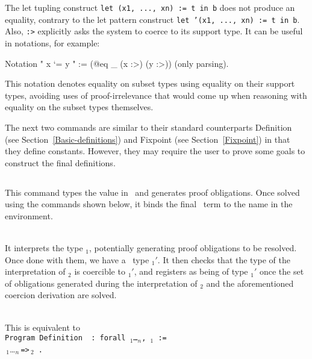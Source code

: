 The let tupling construct {\tt let (x1, ..., xn) := t in b}
does not produce an equality, contrary to the let pattern construct 
{\tt let '(x1, ..., xn) := t in b}.
Also, {\tt {\term}:>} explicitly asks the system to coerce {\tt \term} to its
support type. It can be useful in notations, for example:
\begin{coq_example}
Notation " x `= y " := (@eq _ (x :>) (y :>)) (only parsing).
\end{coq_example}

This notation denotes equality on subset types using equality on their
support types, avoiding uses of proof-irrelevance that would come up
when reasoning with equality on the subset types themselves. 

The next two commands are similar to their standard counterparts
Definition (see Section~\ref{Basic-definitions}) and Fixpoint (see Section~\ref{Fixpoint}) in that
they define constants. However, they may require the user to prove some
goals to construct the final definitions.

\subsection{}

This command types the value {\term} in \Russell\ and generates proof
obligations. Once solved using the commands shown below, it binds the final
\Coq\ term to the name {\ident} in the environment.

\begin{ErrMsgs}
\item {}
\end{ErrMsgs}

\begin{Variants}
\item {}\\
  It interprets the type {\term$_1$}, potentially generating proof
  obligations to be resolved. Once done with them, we have a \Coq\ type
  {\term$_1'$}. It then checks that the type of the interpretation of
  {\term$_2$} is coercible to {\term$_1'$}, and registers {\ident} as
  being of type {\term$_1'$} once the set of obligations generated
  during the interpretation of {\term$_2$} and the aforementioned
  coercion derivation are solved.
\item {}\\
  This is equivalent to \\
   {\tt Program Definition\,{\ident}\,{\tt :\,forall} %
       {\binder$_1$}\ldots{\binder$_n$}{\tt ,}\,\term$_1$\,{\tt :=}} \\
       \,{\binder$_1$}\ldots{\binder$_n$}\,{\tt =>}\,{\term$_2$}\,%
       {\tt .}
\end{Variants}

